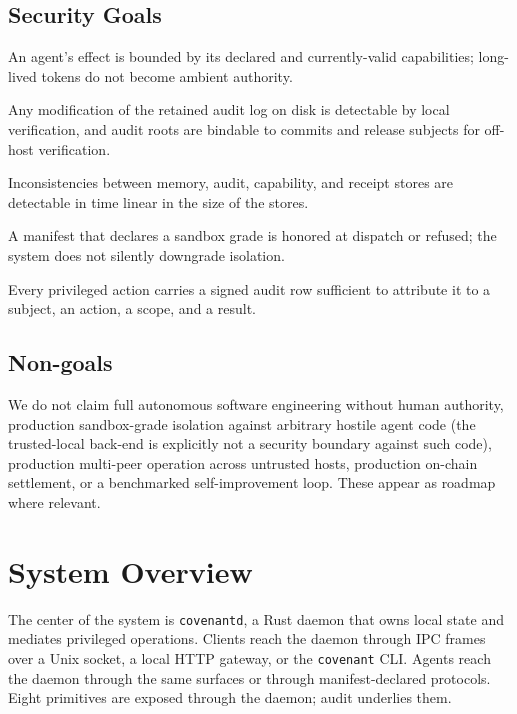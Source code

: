 \documentclass[11pt]{article}
\theoremstyle{plainsmall}
\begin{document}
\subsection{Security Goals}
\label{ssec:goals}

\begin{description}[leftmargin=2.5em,itemsep=2pt]
  \item[\textbf{G1 Authority Containment.}] An agent's effect is bounded by its declared and currently-valid capabilities; long-lived tokens do not become ambient authority.
  \item[\textbf{G2 Tamper-Evident Audit.}] Any modification of the retained audit log on disk is detectable by local verification, and audit roots are bindable to commits and release subjects for off-host verification.
  \item[\textbf{G3 Drift Detection.}] Inconsistencies between memory, audit, capability, and receipt stores are detectable in time linear in the size of the stores.
  \item[\textbf{G4 Fail-Closed Isolation.}] A manifest that declares a sandbox grade is honored at dispatch or refused; the system does not silently downgrade isolation.
  \item[\textbf{G5 Attributable Action.}] Every privileged action carries a signed audit row sufficient to attribute it to a subject, an action, a scope, and a result.
\end{description}

\subsection{Non-goals}
\label{ssec:nongoals}

We do not claim full autonomous software engineering without human authority, production sandbox-grade isolation against arbitrary hostile agent code (the trusted-local back-end is explicitly not a security boundary against such code), production multi-peer operation across untrusted hosts, production on-chain settlement, or a benchmarked self-improvement loop. These appear as roadmap where relevant.

\section{System Overview}
\label{sec:arch}

The center of the system is \texttt{covenantd}, a Rust daemon that owns local state and mediates privileged operations. Clients reach the daemon through IPC frames over a Unix socket, a local HTTP gateway, or the \texttt{covenant} CLI. Agents reach the daemon through the same surfaces or through manifest-declared protocols. Eight primitives are exposed through the daemon; audit underlies them.
\end{document}
